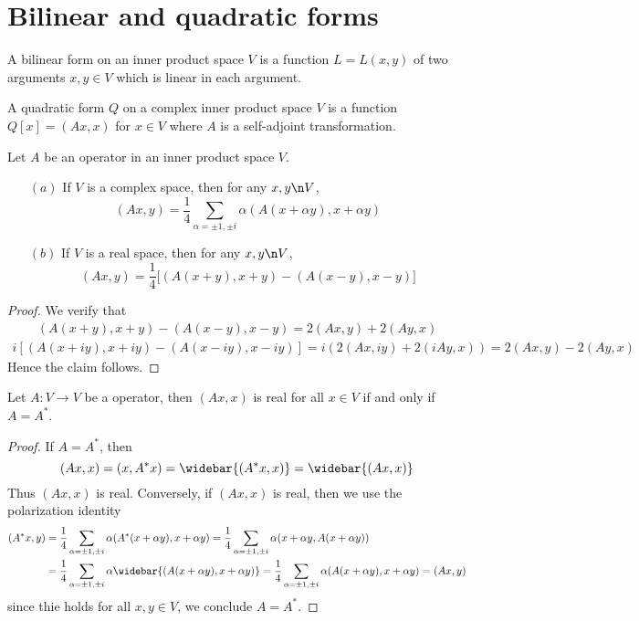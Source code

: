 \section{Bilinear and quadratic forms}
\begin{definition}
A bilinear form on an inner product space $V$ is a function $L=L(x,y)$ of two arguments $x,y\in V$ which is linear in each argument.
\end{definition}
\begin{definition}
A quadratic form $Q$ on a complex inner product space $V$ is a function $Q[x]=(Ax,x)$ for $x\in V$ where $A$ is a self-adjoint transformation.
\end{definition}
\begin{lemma}
Let $A$ be an operator in an inner product space $V$.
\begin{itemize}
\item[$(a)$] If $V$ is a complex space, then for any $x,y\n V$,
\[(Ax,y)=\frac{1}{4}\sum_{\alpha=\pm 1,\pm i}\alpha(A(x+\alpha y),x+\alpha y)\]
\item[$(b)$] If $V$ is a real space, then for any $x,y\n V$,
\[(Ax,y)=\frac{1}{4}\Big[(A(x+y),x+y)-(A(x-y),x-y)\Big]\]
\end{itemize}
\end{lemma}
\begin{proof}
We verify that
\begin{align*}
(A(x+y),x+y)-(A(x-y),x-y)=2(Ax,y)+2(Ay,x)
\end{align*}
\begin{align*}
i[(A(x+iy),x+iy)-(A(x-iy),x-iy)]=i(2(Ax,iy)+2(iAy,x))=2(Ax,y)-2(Ay,x)
\end{align*}
Hence the claim follows.
\end{proof}
\begin{lemma}
Let $A:V\to V$ be a operator, then $(Ax,x)$ is real for all $x\in V$ if and only if $A=A^*$.
\end{lemma}
\begin{proof}
If $A=A^*$, then 
\[(Ax,x)=(x,A^*x)=\widebar{(A^*x,x)}=\widebar{(Ax,x)}\]
Thus $(Ax,x)$ is real. Conversely, if $(Ax,x)$ is real, then we use the polarization identity
\begin{align*}
(A^*x,y)&=\frac{1}{4}\sum_{\alpha=\pm 1,\pm i}\alpha(A^*(x+\alpha y),x+\alpha y)=\frac{1}{4}\sum_{\alpha=\pm 1,\pm i}\alpha(x+\alpha y,A(x+\alpha y))\\
&=\frac{1}{4}\sum_{\alpha=\pm 1,\pm i}\alpha\widebar{(A(x+\alpha y),x+\alpha y)}=\frac{1}{4}\sum_{\alpha=\pm 1,\pm i}\alpha(A(x+\alpha y),x+\alpha y)=(Ax,y)
\end{align*}
since thie holds for all $x,y\in V$, we conclude $A=A^*$.
\end{proof}
